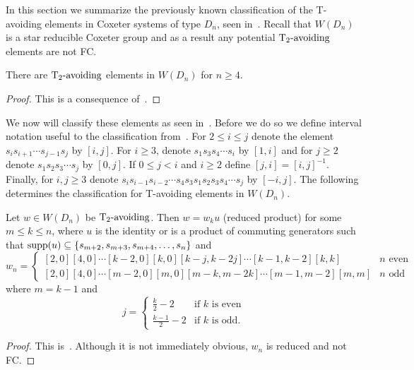 In this section we summarize the previously known classification of the T-avoiding elements in Coxeter systems of type $D_n$, seen in~\cite{Gern2013a}. Recall that $W(D_n)$ is a star reducible Coxeter group and as a result any potential $\operatorname{T_2-\mathrm{avoiding}}$ elements are not FC.

\begin{proposition}
 There are $\operatorname{T_2-\mathrm{avoiding}}$ elements in $W(D_n)$ for $n \geq 4$.
\begin{proof}
	This is a consequence of~\cite[Section 2.2]{Gern2013a}. 
\end{proof}
\end{proposition}

We now will classify these elements as seen in~\cite{Gern2013a}. Before we do so we define interval notation useful to the classification from~\cite[Definition 2.3.1]{Gern2013a}. For $2 \leq i \leq j$ denote the element $s_{i}s_{i+1} \cdots s_{j-1}s_j$ by $[i,j]$. For $i \geq 3$, denote $s_1s_3s_4\cdots s_i$ by $[1,i]$ and for $j \geq 2$ denote $s_1s_2s_3 \cdots s_j$ by $[0,j]$. If $0 \leq j <i$ and $i \geq 2$ define $[j,i]=[i,j]^{-1}$. Finally, for $i,j \geq 3$ denote $s_is_{i-1}s_{i-2} \cdots s_4s_3s_1s_2s_3s_4 \cdots s_j$ by $[-i,j]$. The following determines the classification for T-avoiding elements in $W(D_n)$. 

\begin{proposition}
	Let $w \in W(D_n)$ be $\operatorname{T_2-\mathrm{avoiding}}$. 
Then $w=w_ku$ (reduced product) for some $m \leq k \leq n$, where $u$ is the identity or is a product of commuting generators  such that $\mathrm{supp}(u) \subseteq\{s_{m+2}, s_{m+3}, s_{m+4}, \ldots, s_n\}$ and 
\[ w_n=
\begin{cases}
	[2,0][4,0] \cdots [k-2,0][k,0][k-j,k-2j] \cdots [k-1,k-2][k,k]  &  \text{$n$ even}\\
	[2,0][4,0] \cdots [m-2,0][m,0][m-k,m-2k] \cdots [m-1,m-2][m,m] &  \text{$n$ odd}
\end{cases}
\] where $m=k-1$ and 
\[
j= 
\begin{cases}
\frac{k}{2}-2 & \text{if $k$ is even}\\
\frac{k-1}{2}-2 & \text{if $k$ is odd.}
\end{cases}
\]
\begin{proof}
	This is~\cite[Lemmas 2.2.18 and 2.3.4]{Gern2013a}. Although it is not immediately obvious, $w_n$ is reduced and not FC.
\end{proof}
\end{proposition}

